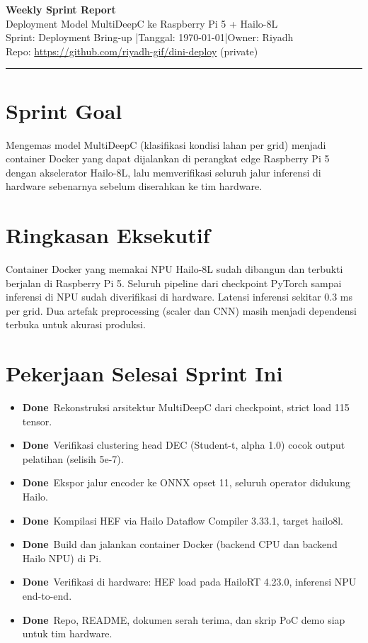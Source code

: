 \documentclass[11pt,a4paper]{article}
\newcommand{\done}{\textbf{\color{ok}Done}}
\begin{document}
\begin{center}
{\LARGE\bfseries Weekly Sprint Report}\\[2pt]
{\large Deployment Model MultiDeepC ke Raspberry Pi 5 + Hailo-8L}\\[6pt]
{\small Sprint: Deployment Bring-up \quad|\quad Tanggal: \today \quad|\quad Owner: Riyadh}\\
{\small Repo: \url{https://github.com/riyadh-gif/dini-deploy} (private)}
\end{center}

\vspace{4pt}
\hrule
\vspace{8pt}

\section{Sprint Goal}
Mengemas model MultiDeepC (klasifikasi kondisi lahan per grid) menjadi container Docker
yang dapat dijalankan di perangkat edge Raspberry Pi 5 dengan akselerator Hailo-8L, lalu
memverifikasi seluruh jalur inferensi di hardware sebenarnya sebelum diserahkan ke tim hardware.

\section{Ringkasan Eksekutif}
Container Docker yang memakai NPU Hailo-8L sudah dibangun dan terbukti berjalan di Raspberry Pi 5.
Seluruh pipeline dari checkpoint PyTorch sampai inferensi di NPU sudah diverifikasi di hardware.
Latensi inferensi sekitar 0.3 ms per grid. Dua artefak preprocessing (scaler dan CNN) masih menjadi
dependensi terbuka untuk akurasi produksi.

\section{Pekerjaan Selesai Sprint Ini}
\begin{itemize}[leftmargin=1.4em,itemsep=2pt]
  \item \done\ Rekonstruksi arsitektur MultiDeepC dari checkpoint, strict load 115 tensor.
  \item \done\ Verifikasi clustering head DEC (Student-t, alpha 1.0) cocok output pelatihan (selisih 5e-7).
  \item \done\ Ekspor jalur encoder ke ONNX opset 11, seluruh operator didukung Hailo.
  \item \done\ Kompilasi HEF via Hailo Dataflow Compiler 3.33.1, target hailo8l.
  \item \done\ Build dan jalankan container Docker (backend CPU dan backend Hailo NPU) di Pi.
  \item \done\ Verifikasi di hardware: HEF load pada HailoRT 4.23.0, inferensi NPU end-to-end.
  \item \done\ Repo, README, dokumen serah terima, dan skrip PoC demo siap untuk tim hardware.
\end{itemize}
\end{document}
